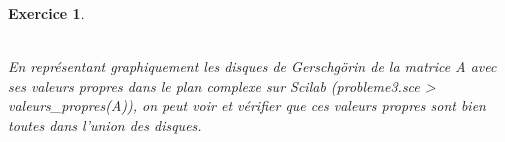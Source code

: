 \documentclass[a4paper,11pt]{article}
\newtheorem{exo}{Exercice}
\begin{document}
\begin{exo}
\begin{enumerate}
\begin{figure}[h]
\end{figure} \ \\
En représentant graphiquement les disques de Gerschgörin de la matrice A avec ses valeurs propres dans le plan complexe sur Scilab (probleme3.sce > valeurs\_propres(A)), on peut voir et vérifier que ces valeurs propres sont bien toutes dans l'union des disques.
\end{enumerate}
\end{exo}

\end{document}
